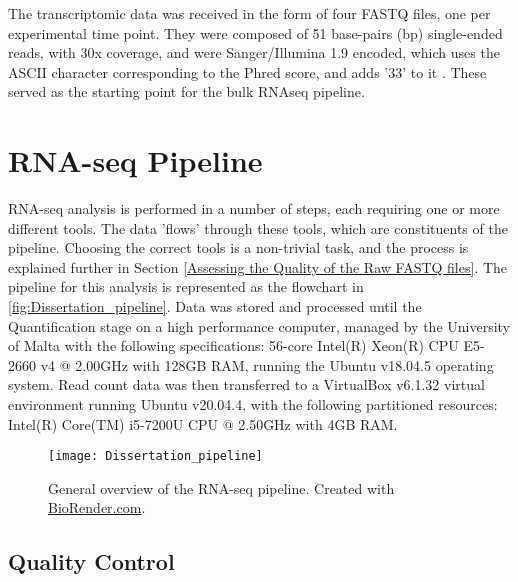 The transcriptomic data was received in the form of four FASTQ \citep{cock2010sanger} files, one per experimental time point. They were composed of 51 base-pairs (bp) single-ended reads, with 30x coverage, and were Sanger/Illumina 1.9 encoded, which uses the ASCII character corresponding to the Phred score, and adds '33' to it \citep{ewing1998base}. These served as the starting point for the bulk RNAseq pipeline.

\section{RNA-seq Pipeline}%
RNA-seq analysis is performed in a number of steps, each requiring one or more different tools. The data 'flows' through these tools, which are constituents of the pipeline. Choosing the correct tools is a non-trivial task, and the process is explained further in Section \ref{Assessing the Quality of the Raw FASTQ files}. The pipeline for this analysis is represented as the flowchart in \autoref{fig:Dissertation_pipeline}.
Data was stored and processed until the Quantification stage on a high performance computer, managed by the University of Malta with the following specifications: 56-core Intel(R) Xeon(R) CPU E5-2660 v4 @ 2.00GHz with 128GB RAM, running the Ubuntu v18.04.5 operating system. Read count data was then transferred to a VirtualBox v6.1.32 \citep{virtualbox} virtual environment running Ubuntu v20.04.4, with the following partitioned resources: Intel(R) Core(TM) i5-7200U CPU @ 2.50GHz with 4GB RAM.
\begin{figure}[!ht]
    \centering
    \texttt{[image: Dissertation\_pipeline]}
    \caption[General overview of the RNA-seq pipeline.]{General overview of the RNA-seq pipeline. Created with \href{https://biorender.com/}{BioRender.com}.} 
    \label{fig:Dissertation_pipeline}
\end{figure}

\clearpage
\subsection{Quality Control}%


